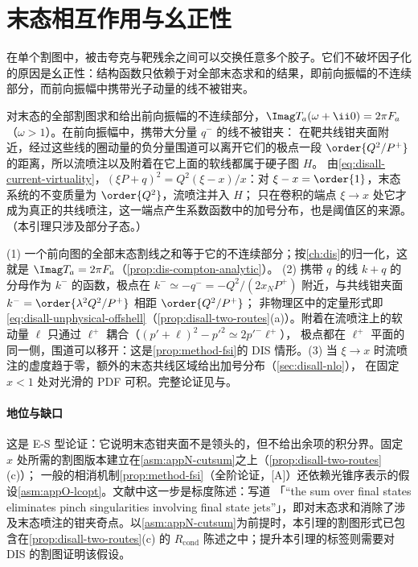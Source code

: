 \section{末态相互作用与幺正性}\label{sec:disall-fsi}

在单个割图中，被击夸克与靶残余之间可以交换任意多个胶子。它们不破坏因子化的原因是幺正性：结构函数只依赖于对全部末态求和的结果，即前向振幅的不连续部分，而前向振幅中携带光子动量的线不被钳夹。

\begin{lemma}\label{lem:disall-fsi}
对末态的全部割图求和给出前向振幅的不连续部分，$\Imag T_a(\omega+\ii0)=2\pi F_a$（$\omega>1$）。在前向振幅中，携带大分量 $q^-$ 的线不被钳夹：
在靶共线钳夹面附近，经过这些线的圈动量的负分量围道可以离开它们的极点一段 $\order{Q^2/P^+}$ 的距离，所以流喷注以及附着在它上面的软线都属于硬子图 $H$。
由\cref{eq:disall-current-virtuality}，$(\xi P+q)^2=Q^2(\xi-x)/x$：对 $\xi-x=\order{1}$，末态系统的不变质量为 $\order{Q^2}$，流喷注并入 $H$；
只在卷积的端点 $\xi\to x$ 处它才成为真正的共线喷注，这一端点产生系数函数中的加号分布，也是阈值区的来源。（本引理只涉及部分子态。）
\end{lemma}

\begin{proofsketch}
(1) 一个前向图的全部末态割线之和等于它的不连续部分；按\cref{ch:dis}的归一化，这就是 $\Imag T_a=2\pi F_a$（\cref{prop:dis-compton-analytic}）。
(2) 携带 $q$ 的线 $k+q$ 的分母作为 $k^-$ 的函数，极点在 $k^-\simeq-q^-=-Q^2/(2x_NP^+)$ 附近，与共线钳夹面 $k^-=\order{\lambda^2Q^2/P^+}$ 相距 $\order{Q^2/P^+}$；
非物理区中的定量形式即\cref{eq:disall-unphysical-offshell}（\cref{prop:disall-two-routes}(a)）。附着在流喷注上的软动量 $\ell$ 只通过 $\ell^+$ 耦合（$(p'+\ell)^2-p'^2\simeq2p'^-\ell^+$），
极点都在 $\ell^+$ 平面的同一侧，围道可以移开：这是\cref{prop:method-fsi}的 DIS 情形。(3) 当 $\xi\to x$ 时流喷注的虚度趋于零，额外的末态共线区域给出加号分布（\cref{sec:disall-nlo}），
在固定 $x<1$ 处对光滑的 PDF 可积。完整论证见\cite[第~8.7~节]{CollinsSoperSterman1989}与\cite{LibbySterman1978a}。
\end{proofsketch}

\paragraph{地位与缺口}
这是 E-S 型论证：它说明末态钳夹面不是领头的，但不给出余项的积分界。固定 $x$ 处所需的割图版本建立在\cref{asm:appN-cutsum}之上（\cref{prop:disall-two-routes}(c)）；
一般的相消机制\cref{prop:method-fsi}（全阶论证，[A]）还依赖光锥序表示的假设\cref{asm:appO-lcopt}。文献中这一步是标度陈述：\cite[第~8.7~节]{CollinsSoperSterman1989}写道
「“the sum over final states eliminates pinch singularities involving final state jets”」，即对末态求和消除了涉及末态喷注的钳夹奇点。以\cref{asm:appN-cutsum}为前提时，本引理的割图形式已包含在\cref{prop:disall-two-routes}(c) 的 $R_{\mathrm{cond}}$ 陈述之中；提升本引理的标签则需要对 DIS 的割图证明该假设。

